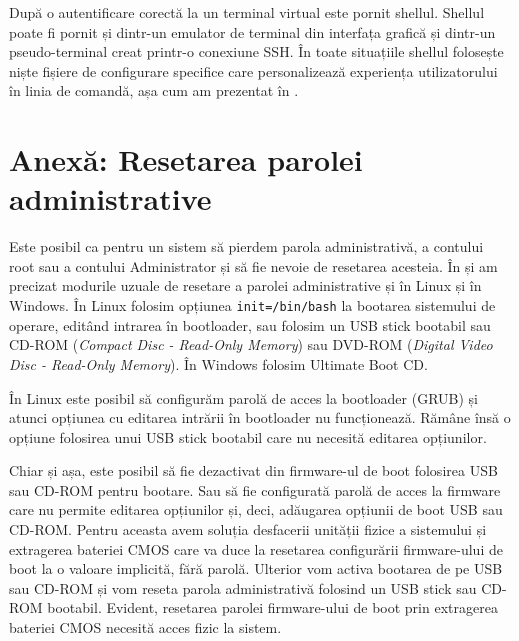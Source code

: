 
După o autentificare corectă la un terminal virtual este pornit shellul.
 Shellul poate fi pornit și dintr-un emulator de terminal din interfața grafică și dintr-un pseudo-terminal creat printr-o conexiune SSH.
În toate situațiile shellul folosește niște fișiere de configurare specifice care personalizează experiența utilizatorului în linia de comandă, așa cum am prezentat în .

\section{Anexă: Resetarea parolei administrative}
\label{sec:boot:pass-reset}

Este posibil ca pentru un sistem să pierdem parola administrativă, a contului root sau a contului Administrator și să fie nevoie de resetarea acesteia.
În  și  am precizat modurile uzuale de resetare a parolei administrative și în Linux și în Windows.
În Linux folosim opțiunea \texttt{init=/bin/bash} la bootarea sistemului de operare, editând intrarea în bootloader, sau folosim un USB stick bootabil sau CD-ROM  (\textit{Compact Disc - Read-Only Memory}) sau DVD-ROM  (\textit{Digital Video Disc - Read-Only Memory}).
În Windows folosim Ultimate Boot CD.

În Linux este posibil să configurăm parolă de acces la bootloader (GRUB) și atunci opțiunea cu editarea intrării în bootloader nu funcționează.
Rămâne însă o opțiune folosirea unui USB stick bootabil care nu necesită editarea opțiunilor.

Chiar și așa, este posibil să fie dezactivat din firmware-ul de boot folosirea USB sau CD-ROM pentru bootare.
Sau să fie configurată parolă de acces la firmware care nu permite editarea opțiunilor și, deci, adăugarea opțiunii de boot USB sau CD-ROM.
Pentru aceasta avem soluția desfacerii unității fizice a sistemului și extragerea bateriei CMOS care va duce la resetarea configurării firmware-ului de boot la o valoare implicită, fără parolă.
Ulterior vom activa bootarea de pe USB sau CD-ROM și vom reseta parola administrativă folosind un USB stick sau CD-ROM bootabil.
Evident, resetarea parolei firmware-ului de boot prin extragerea bateriei CMOS necesită acces fizic la sistem.

